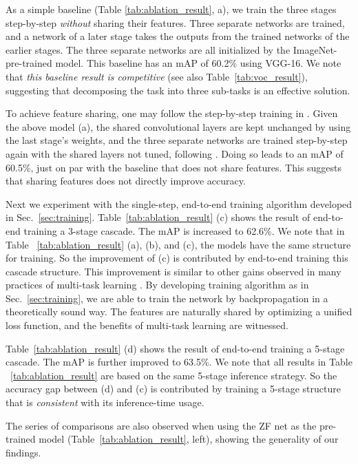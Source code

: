\documentclass[10pt,twocolumn,letterpaper]{article}
\begin{document}
As a simple baseline (Table \ref{tab:ablation_result}, a), we train the three stages step-by-step \emph{without} sharing their features. Three separate networks are trained, and a network of a later stage takes the outputs from the trained networks of the earlier stages. The three separate networks are all initialized by the ImageNet-pre-trained model. This baseline has an mAP of 60.2\% using VGG-16. We note that \emph{this baseline result is competitive} (see also Table~\ref{tab:voc_result}), suggesting that decomposing the task into three sub-tasks is an effective solution.

To achieve feature sharing, one may follow the step-by-step training in \cite{Ren2015}. Given the above model (a), the shared convolutional layers are kept unchanged by using the last stage's weights, and the three separate networks are trained step-by-step again with the shared layers not tuned, following \cite{Ren2015}. Doing so leads to an mAP of 60.5\%, just on par with the baseline that does not share features. This suggests that sharing features does not directly improve accuracy.

Next we experiment with the single-step, end-to-end training algorithm developed in Sec.~\ref{sec:training}. Table~\ref{tab:ablation_result} (c) shows the result of end-to-end training a 3-stage cascade. The mAP is increased to 62.6\%. We note that in Table ~\ref{tab:ablation_result} (a), (b), and (c), the models have the same structure for training. So the improvement of (c) is contributed by end-to-end training this cascade structure.
This improvement is similar to other gains observed in many practices of multi-task learning \cite{Caruana1997}.
By developing training algorithm as in Sec.~\ref{sec:training}, we are able to train the network by backpropagation in a theoretically sound way. The features are naturally shared by optimizing a unified loss function, and the benefits of multi-task learning are witnessed.

Table~\ref{tab:ablation_result} (d) shows the result of end-to-end training a 5-stage cascade. The mAP is further improved to 63.5\%. We note that all results in Table ~\ref{tab:ablation_result} are based on the same 5-stage inference strategy. So the accuracy gap between (d) and (c) is contributed by training a 5-stage structure that is \emph{consistent} with its inference-time usage.

The series of comparisons are also observed when using the ZF net as the pre-trained model (Table~\ref{tab:ablation_result}, left), showing the generality of our findings.
\end{document}
